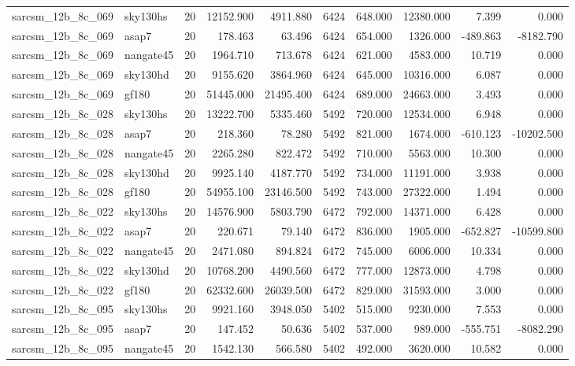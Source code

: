 \begin{tabular}{llrrrrrrrr}
sarcsm\_12b\_8c\_069 & sky130hs & 20 & 12152.900 & 4911.880 & 6424 & 648.000 & 12380.000 & 7.399 & 0.000 \\
sarcsm\_12b\_8c\_069 & asap7 & 20 & 178.463 & 63.496 & 6424 & 654.000 & 1326.000 & -489.863 & -8182.790 \\
sarcsm\_12b\_8c\_069 & nangate45 & 20 & 1964.710 & 713.678 & 6424 & 621.000 & 4583.000 & 10.719 & 0.000 \\
sarcsm\_12b\_8c\_069 & sky130hd & 20 & 9155.620 & 3864.960 & 6424 & 645.000 & 10316.000 & 6.087 & 0.000 \\
sarcsm\_12b\_8c\_069 & gf180 & 20 & 51445.000 & 21495.400 & 6424 & 689.000 & 24663.000 & 3.493 & 0.000 \\
sarcsm\_12b\_8c\_028 & sky130hs & 20 & 13222.700 & 5335.460 & 5492 & 720.000 & 12534.000 & 6.948 & 0.000 \\
sarcsm\_12b\_8c\_028 & asap7 & 20 & 218.360 & 78.280 & 5492 & 821.000 & 1674.000 & -610.123 & -10202.500 \\
sarcsm\_12b\_8c\_028 & nangate45 & 20 & 2265.280 & 822.472 & 5492 & 710.000 & 5563.000 & 10.300 & 0.000 \\
sarcsm\_12b\_8c\_028 & sky130hd & 20 & 9925.140 & 4187.770 & 5492 & 734.000 & 11191.000 & 3.938 & 0.000 \\
sarcsm\_12b\_8c\_028 & gf180 & 20 & 54955.100 & 23146.500 & 5492 & 743.000 & 27322.000 & 1.494 & 0.000 \\
sarcsm\_12b\_8c\_022 & sky130hs & 20 & 14576.900 & 5803.790 & 6472 & 792.000 & 14371.000 & 6.428 & 0.000 \\
sarcsm\_12b\_8c\_022 & asap7 & 20 & 220.671 & 79.140 & 6472 & 836.000 & 1905.000 & -652.827 & -10599.800 \\
sarcsm\_12b\_8c\_022 & nangate45 & 20 & 2471.080 & 894.824 & 6472 & 745.000 & 6006.000 & 10.334 & 0.000 \\
sarcsm\_12b\_8c\_022 & sky130hd & 20 & 10768.200 & 4490.560 & 6472 & 777.000 & 12873.000 & 4.798 & 0.000 \\
sarcsm\_12b\_8c\_022 & gf180 & 20 & 62332.600 & 26039.500 & 6472 & 829.000 & 31593.000 & 3.000 & 0.000 \\
sarcsm\_12b\_8c\_095 & sky130hs & 20 & 9921.160 & 3948.050 & 5402 & 515.000 & 9230.000 & 7.553 & 0.000 \\
sarcsm\_12b\_8c\_095 & asap7 & 20 & 147.452 & 50.636 & 5402 & 537.000 & 989.000 & -555.751 & -8082.290 \\
sarcsm\_12b\_8c\_095 & nangate45 & 20 & 1542.130 & 566.580 & 5402 & 492.000 & 3620.000 & 10.582 & 0.000 \\

\end{tabular}
